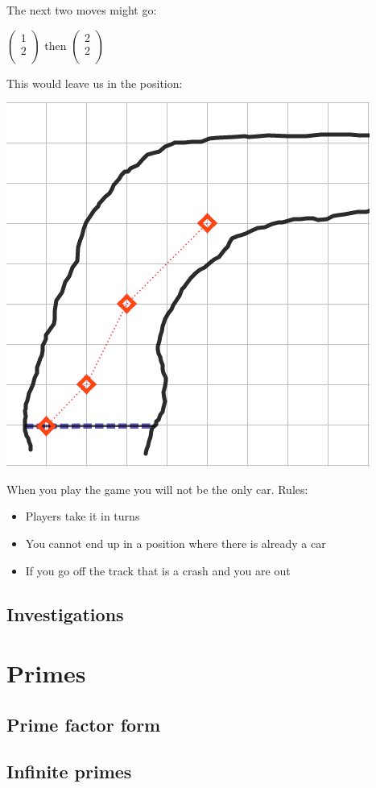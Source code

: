 The next two moves might go:

$\left(
\begin{array}{c}
1\\
2\\
\end{array}
\right)$
then
$\left(
\begin{array}{c}
2\\
2\\
\end{array}
\right)$

This would leave us in the position:

\bigskip
\begin{center}
  \includegraphics[scale=0.6]{./Images/Sequences/VMR_3.png}
\end{center}

When you play the game you will not be the only car.
Rules:
\begin{itemize}
  \item Players take it in turns
  \item You cannot end up in a position where there is already a car
  \item If you go off the track that is a crash and you are out
\end{itemize}
\subsection{Investigations}
\section{Primes}
\subsection{Prime factor form}
\subsection{Infinite primes}
